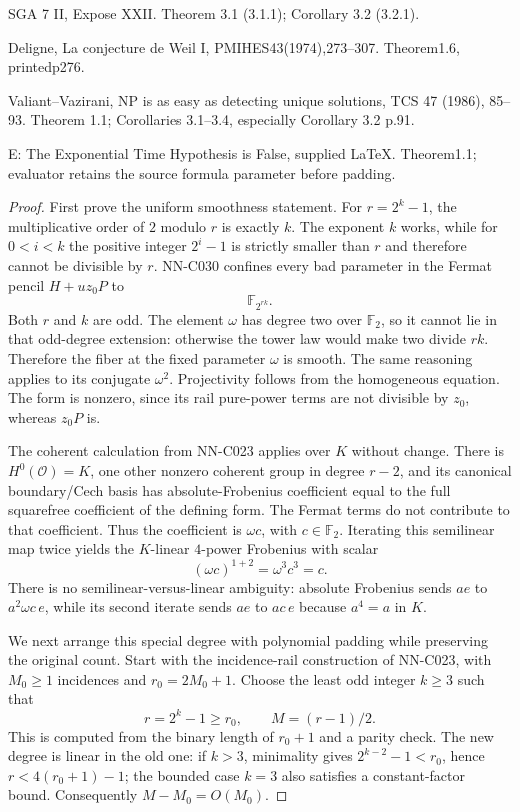 SGA 7 II, Expose XXII. Theorem 3.1 (3.1.1); Corollary 3.2 (3.2.1).

Deligne, La conjecture de Weil I, PMIHES43(1974),273--307. Theorem1.6, printedp276.

Valiant--Vazirani, NP is as easy as detecting unique solutions, TCS 47 (1986), 85--93. Theorem 1.1; Corollaries 3.1--3.4, especially Corollary 3.2 p.91.

E: The Exponential Time Hypothesis is False, supplied LaTeX. Theorem1.1; evaluator retains the source formula parameter before padding.

\begin{proof}
First prove the uniform smoothness statement. For $r=2^k-1$, the multiplicative order of $2$ modulo $r$ is exactly $k$. The exponent $k$ works, while for $0<i<k$ the positive integer $2^i-1$ is strictly smaller than $r$ and therefore cannot be divisible by $r$. NN-C030 confines every bad parameter in the Fermat pencil $H+u z_0P$ to
\[
                            \mathbb F_{2^{rk}}.
\]
Both $r$ and $k$ are odd. The element $\omega$ has degree two over $\mathbb F_2$, so it cannot lie in that odd-degree extension: otherwise the tower law would make two divide $rk$. Therefore the fiber at the fixed parameter $\omega$ is smooth. The same reasoning applies to its conjugate $\omega^2$. Projectivity follows from the homogeneous equation. The form is nonzero, since its rail pure-power terms are not divisible by $z_0$, whereas $z_0P$ is.

The coherent calculation from NN-C023 applies over $K$ without change. There is $H^0(\mathcal O)=K$, one other nonzero coherent group in degree $r-2$, and its canonical boundary/Cech basis has absolute-Frobenius coefficient equal to the full squarefree coefficient of the defining form. The Fermat terms do not contribute to that coefficient. Thus the coefficient is $\omega c$, with $c\in\mathbb F_2$. Iterating this semilinear map twice yields the $K$-linear $4$-power Frobenius with scalar
\[
                        (\omega c)^{1+2}=\omega^3c^3=c.
\]
There is no semilinear-versus-linear ambiguity: absolute Frobenius sends $ae$ to $a^2\omega c\,e$, while its second iterate sends $ae$ to $a c\,e$ because $a^4=a$ in $K$.

We next arrange this special degree with polynomial padding while preserving the original count. Start with the incidence-rail construction of NN-C023, with $M_0\geq1$ incidences and $r_0=2M_0+1$. Choose the least odd integer $k\geq3$ such that
\[
                  r=2^k-1\geq r_0,
                 \qquad M=(r-1)/2.
\]
This is computed from the binary length of $r_0+1$ and a parity check. The new degree is linear in the old one: if $k>3$, minimality gives $2^{k-2}-1<r_0$, hence $r<4(r_0+1)-1$; the bounded case $k=3$ also satisfies a constant-factor bound. Consequently $M-M_0=O(M_0)$.


\end{proof}
